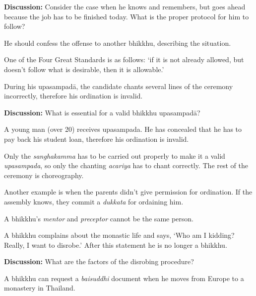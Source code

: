 \begin{exam}{\autoExamName}
\begin{problem*}
\begin{parts}
    \textbf{Discussion:} Consider the case when he knows and remembers, but goes
    ahead because the job has to be finished today. What is the proper protocol
    for him to follow?

    \begin{solution}
      He should confess the offense to another bhikkhu, describing the situation.
    \end{solution}

  \item {} One of the Four Great Standards is as follows: `if it is not
    already allowed, but doesn't follow what is desirable, then it is
    allowable.'

  \item {} During his upasampadā, the candidate chants several lines of the
    ceremony incorrectly, therefore his ordination is invalid.

    \bigskip

    \textbf{Discussion:} What is essential for a valid bhikkhu upasampadā?
    
  \item {} A young man (over 20) receives upasampada. He has concealed that
    he has to pay back his student loan, therefore his ordination is invalid.

    \begin{solution}
      Only the \emph{sanghakamma} has to be carried out properly to make it a
      valid \emph{upasampada}, so only the chanting \emph{acariya} has to chant
      correctly. The rest of the ceremony is choreography.

      Another example is when the parents didn't give permission for ordination.
      If the assembly knows, they commit a \emph{dukkata} for ordaining him.
    \end{solution}

  \item {} A bhikkhu's \emph{mentor} and \emph{preceptor} cannot be the same
    person.

  \item {} A bhikkhu complains about the monastic life and says, `Who am I kidding? Really,
    I want to disrobe.' After this statement he is no longer a bhikkhu.

    \bigskip

    \textbf{Discussion:} What are the factors of the disrobing procedure?

  \item {} A bhikkhu can request a \emph{baisuddhi} document when he moves from Europe to a monastery in Thailand.


\end{parts}
\end{problem*}
\end{exam}
